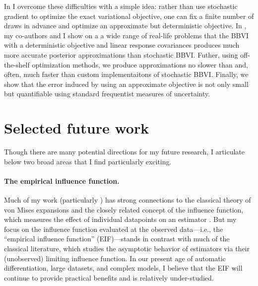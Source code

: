In \citet{giordano:2018:covariances, giordano:2021:bbvi} I overcome these
difficulties with a simple idea: rather than use stochastic gradient to optimize
the exact variational objective, one can fix a finite number of draws in advance
and optimize an approximate but deterministic objective.  In
\citet{giordano:2021:bbvi}, my co-authors and I show on a a wide range of
real-life problems that the BBVI with a deterministic objective and linear
response covariances produces much more accurate posterior approximations than
stochastic BBVI.  Futher, using off-the-shelf optimization methods, we produce
approximations no slower than and, often, much faster than custom
implementaitons of stochastic BBVI.  Finally, we show that the error induced by
using an approximate objective is not only small but quantifiable using standard
frequentist measures of uncertainty.




\section{Selected future work}

Though there are many potential directions for my future research, I articulate
below two broad areas that I find particularly exciting.

\paragraph{The empirical influence function.}
%
Much of my work (particularly \citet{giordano:2019:ij, giordano:2020:amip,
giordano:2021:bayesij}) has strong connections to the classical theory of von
Mises expansions and the closely related concept of the influence function,
which measures the effect of individual datapoints on an estimator
\citep{mises:1947:asymptotic, reeds:1976:thesis, hampel:1986:robustbook,
serfling:2009:approximation}.  But my focus on the influence function
evaluated at the observed data---i.e., the ``empirical influence function''
(EIF)---stands in contrast with much of the classical literature, which studies
the asymptotic behavior of estimators via their (unobserved) limiting influence
function.
%
In our present age of automatic differentiation, large datasets, and complex
models, I believe that the EIF will continue to provide practical benefits and
is relatively under-studied.

